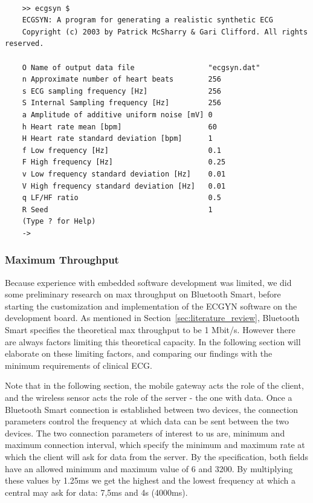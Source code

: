 \begin{lstlisting}[caption={ECGSYN Commando Line Interface (CLI)}, label={lst:ecgsyn_terminal}, basicstyle=\tiny]

    >> ecgsyn $
    ECGSYN: A program for generating a realistic synthetic ECG
    Copyright (c) 2003 by Patrick McSharry & Gari Clifford. All rights reserved.
     
    O Name of output data file                 "ecgsyn.dat"
    n Approximate number of heart beats        256
    s ECG sampling frequency [Hz]              256
    S Internal Sampling frequency [Hz]         256
    a Amplitude of additive uniform noise [mV] 0
    h Heart rate mean [bpm]                    60
    H Heart rate standard deviation [bpm]      1
    f Low frequency [Hz]                       0.1
    F High frequency [Hz]                      0.25
    v Low frequency standard deviation [Hz]    0.01
    V High frequency standard deviation [Hz]   0.01
    q LF/HF ratio                              0.5
    R Seed                                     1
    (Type ? for Help)
    ->

\end{lstlisting}

\subsubsection{Maximum Throughput} %
\label{ssub:maximum_throughput}

Because experience with embedded software development was limited, we did some preliminary research on max throughput on Bluetooth Smart, before starting the customization and implementation of the ECGYN software on the development board. As mentioned in Section~\ref{sec:literature_review}, Bluetooth Smart specifies the theoretical max throughput to be 1 Mbit/s. However there are always factors limiting this theoretical capacity. In the following section will elaborate on these limiting factors, and comparing our findings with the minimum requirements of clinical ECG.

Note that in the following section, the mobile gateway acts the role of the client, and the wireless sensor acts the role of the server - the one with data. Once a Bluetooth Smart connection is established between two devices, the connection parameters \cite{newRef:59} control the frequency at which data can be sent between the two devices. The two connection parameters of interest to us are, minimum and maximum connection interval, which specify the minimum and maximum rate at which the client will ask for data from the server. By the specification, both fields have an allowed minimum and maximum value of 6 and 3200. By multiplying these values by 1.25ms we get the highest and the lowest frequency at which a central may ask for data: 7,5ms and 4s (4000ms).

